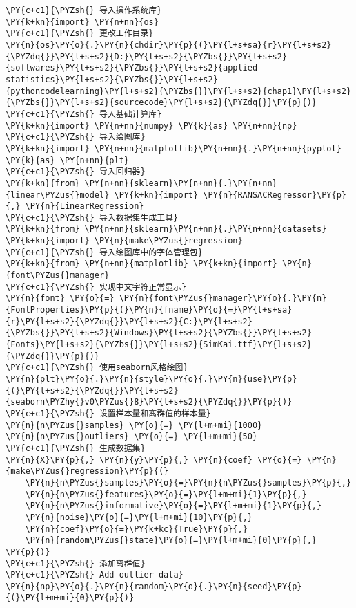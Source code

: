\begin{Verbatim}[commandchars=\\\{\}]
\PY{c+c1}{\PYZsh{} 导入操作系统库}
\PY{k+kn}{import} \PY{n+nn}{os}
\PY{c+c1}{\PYZsh{} 更改工作目录}
\PY{n}{os}\PY{o}{.}\PY{n}{chdir}\PY{p}{(}\PY{l+s+sa}{r}\PY{l+s+s2}{\PYZdq{}}\PY{l+s+s2}{D:}\PY{l+s+s2}{\PYZbs{}}\PY{l+s+s2}{softwares}\PY{l+s+s2}{\PYZbs{}}\PY{l+s+s2}{applied statistics}\PY{l+s+s2}{\PYZbs{}}\PY{l+s+s2}{pythoncodelearning}\PY{l+s+s2}{\PYZbs{}}\PY{l+s+s2}{chap1}\PY{l+s+s2}{\PYZbs{}}\PY{l+s+s2}{sourcecode}\PY{l+s+s2}{\PYZdq{}}\PY{p}{)}
\PY{c+c1}{\PYZsh{} 导入基础计算库}
\PY{k+kn}{import} \PY{n+nn}{numpy} \PY{k}{as} \PY{n+nn}{np}
\PY{c+c1}{\PYZsh{} 导入绘图库}
\PY{k+kn}{import} \PY{n+nn}{matplotlib}\PY{n+nn}{.}\PY{n+nn}{pyplot} \PY{k}{as} \PY{n+nn}{plt}
\PY{c+c1}{\PYZsh{} 导入回归器}
\PY{k+kn}{from} \PY{n+nn}{sklearn}\PY{n+nn}{.}\PY{n+nn}{linear\PYZus{}model} \PY{k+kn}{import} \PY{n}{RANSACRegressor}\PY{p}{,} \PY{n}{LinearRegression}
\PY{c+c1}{\PYZsh{} 导入数据集生成工具}
\PY{k+kn}{from} \PY{n+nn}{sklearn}\PY{n+nn}{.}\PY{n+nn}{datasets} \PY{k+kn}{import} \PY{n}{make\PYZus{}regression}
\PY{c+c1}{\PYZsh{} 导入绘图库中的字体管理包}
\PY{k+kn}{from} \PY{n+nn}{matplotlib} \PY{k+kn}{import} \PY{n}{font\PYZus{}manager}
\PY{c+c1}{\PYZsh{} 实现中文字符正常显示}
\PY{n}{font} \PY{o}{=} \PY{n}{font\PYZus{}manager}\PY{o}{.}\PY{n}{FontProperties}\PY{p}{(}\PY{n}{fname}\PY{o}{=}\PY{l+s+sa}{r}\PY{l+s+s2}{\PYZdq{}}\PY{l+s+s2}{C:}\PY{l+s+s2}{\PYZbs{}}\PY{l+s+s2}{Windows}\PY{l+s+s2}{\PYZbs{}}\PY{l+s+s2}{Fonts}\PY{l+s+s2}{\PYZbs{}}\PY{l+s+s2}{SimKai.ttf}\PY{l+s+s2}{\PYZdq{}}\PY{p}{)}
\PY{c+c1}{\PYZsh{} 使用seaborn风格绘图}
\PY{n}{plt}\PY{o}{.}\PY{n}{style}\PY{o}{.}\PY{n}{use}\PY{p}{(}\PY{l+s+s2}{\PYZdq{}}\PY{l+s+s2}{seaborn\PYZhy{}v0\PYZus{}8}\PY{l+s+s2}{\PYZdq{}}\PY{p}{)}
\PY{c+c1}{\PYZsh{} 设置样本量和离群值的样本量}
\PY{n}{n\PYZus{}samples} \PY{o}{=} \PY{l+m+mi}{1000}
\PY{n}{n\PYZus{}outliers} \PY{o}{=} \PY{l+m+mi}{50}
\PY{c+c1}{\PYZsh{} 生成数据集}
\PY{n}{X}\PY{p}{,} \PY{n}{y}\PY{p}{,} \PY{n}{coef} \PY{o}{=} \PY{n}{make\PYZus{}regression}\PY{p}{(}
    \PY{n}{n\PYZus{}samples}\PY{o}{=}\PY{n}{n\PYZus{}samples}\PY{p}{,}
    \PY{n}{n\PYZus{}features}\PY{o}{=}\PY{l+m+mi}{1}\PY{p}{,}
    \PY{n}{n\PYZus{}informative}\PY{o}{=}\PY{l+m+mi}{1}\PY{p}{,}
    \PY{n}{noise}\PY{o}{=}\PY{l+m+mi}{10}\PY{p}{,}
    \PY{n}{coef}\PY{o}{=}\PY{k+kc}{True}\PY{p}{,}
    \PY{n}{random\PYZus{}state}\PY{o}{=}\PY{l+m+mi}{0}\PY{p}{,}
\PY{p}{)}
\PY{c+c1}{\PYZsh{} 添加离群值}
\PY{c+c1}{\PYZsh{} Add outlier data}
\PY{n}{np}\PY{o}{.}\PY{n}{random}\PY{o}{.}\PY{n}{seed}\PY{p}{(}\PY{l+m+mi}{0}\PY{p}{)}

\end{Verbatim}
